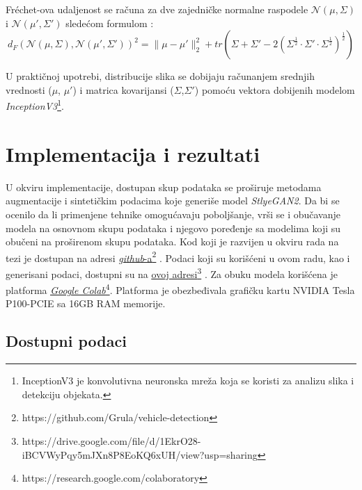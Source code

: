 \documentclass[12pt,oneside]{memoir}
\begin{document}
Fréchet-ova udaljenost se računa za dve zajedničke normalne raspodele \(\mathcal{N}(\mu,\Sigma)\) i \(\mathcal{N}(\mu',\Sigma')\) sledećom formulom \cite{dowson1982frechet, heusel2017gans}:
\begin{equation}
    d_{F}(\mathcal N(\mu, \Sigma), \mathcal N(\mu', \Sigma'))^2 =
        \| \mu - \mu' \|^{2}_{2} + 
        tr\left(\Sigma + \Sigma' -
        2\left(\Sigma^\frac{1}{2} \cdot \Sigma' \cdot \Sigma^\frac{1}{2} \right)^\frac{1}{2} \right)
\end{equation}

U praktičnoj upotrebi, distribucije slika se dobijaju računanjem srednjih vrednosti (\(\mu\), \(\mu'\)) i matrica kovarijansi (\(\Sigma\),\(\Sigma'\)) pomoću vektora dobijenih modelom \textit{InceptionV3}\footnote{InceptionV3 je konvolutivna neuronska mreža koja se koristi za analizu slika i detekciju objekata.}.


\clearpage
\chapter{Implementacija i rezultati}
\label{section5}

U okviru implementacije, dostupan skup podataka se proširuje metodama augmentacije i sintetičkim podacima koje generiše model \textit{StlyeGAN2}.
Da bi se ocenilo da li primenjene tehnike omogućavaju poboljšanje, vrši se i obučavanje modela na osnovnom skupu podataka i njegovo poređenje sa modelima koji su obučeni na proširenom skupu podataka.
Kod koji je razvijen u okviru rada na tezi je dostupan na adresi  \underline{\href{https://github.com/Grula/vehicle-detection}{\textit{github}-a}}\footnote{https://github.com/Grula/vehicle-detection} \cite{vehicleGit2022}. Podaci koji su korišćeni u ovom radu, kao i generisani podaci, dostupni su na \href{https://drive.google.com/file/d/1EkrO28-iBCVWyPqy5mJXn8P8EoKQ6xUH/view?usp=sharing}{\underline{ovoj adresi}}\footnote{https://drive.google.com/file/d/1EkrO28-iBCVWyPqy5mJXn8P8EoKQ6xUH/view?usp=sharing} \cite{vehicleData2022}. Za obuku modela korišćena je platforma \href{https://research.google.com/colaboratory/}{\underline{\textit{Google Colab}}}\footnote{https://research.google.com/colaboratory}. Platforma je obezbeđivala grafičku kartu NVIDIA Tesla P100-PCIE sa 16GB RAM memorije. 

\section{Dostupni podaci}
\end{document}
